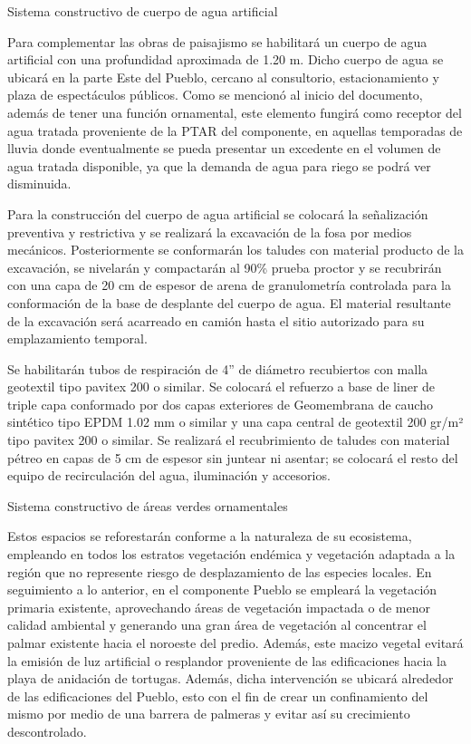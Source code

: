 \documentclass{article}
\begin{document}
\bigskip


\bigskip

Sistema constructivo de cuerpo de agua artificial


\bigskip

Para complementar las obras de paisajismo se habilitará un cuerpo de agua artificial con una profundidad aproximada de 1.20 m. Dicho cuerpo de agua se ubicará en la parte Este del Pueblo, cercano al consultorio, estacionamiento y plaza de espectáculos públicos. Como se mencionó al inicio del documento, además de tener una función ornamental, este elemento fungirá como receptor del agua tratada proveniente de la PTAR del componente, en aquellas temporadas de lluvia donde eventualmente se pueda presentar un excedente en el volumen de agua tratada disponible, ya que la demanda de agua para riego se podrá ver disminuida. 


\bigskip

Para la construcción del cuerpo de agua artificial se colocará la señalización preventiva y restrictiva y se realizará la excavación de la fosa por medios mecánicos. Posteriormente se conformarán los taludes con material producto de la excavación, se nivelarán y compactarán al 90\% prueba proctor y se recubrirán con una capa de 20 cm de espesor de arena de granulometría controlada para la conformación de la base de desplante del cuerpo de agua. El material resultante de la excavación será acarreado en camión hasta el sitio autorizado para su emplazamiento temporal.


\bigskip

Se habilitarán tubos de respiración de 4” de diámetro recubiertos con malla geotextil tipo pavitex 200 o similar. Se colocará el refuerzo a base de liner de triple capa conformado por dos capas exteriores de Geomembrana de caucho sintético tipo EPDM 1.02 mm o similar y una capa central de geotextil 200 gr/m² tipo pavitex 200 o similar. Se realizará el recubrimiento de taludes con material pétreo en capas de 5 cm de espesor sin juntear ni asentar; se colocará el resto del equipo de recirculación del agua, iluminación y accesorios.


\bigskip


\bigskip

Sistema constructivo de áreas verdes ornamentales


\bigskip

Estos espacios se reforestarán conforme a la naturaleza de su ecosistema, empleando en todos los estratos vegetación endémica y vegetación adaptada a la región que no represente riesgo de desplazamiento de las especies locales. En seguimiento a lo anterior, en el componente Pueblo se empleará la vegetación primaria existente, aprovechando áreas de vegetación impactada o de menor calidad ambiental y generando una gran área de vegetación al concentrar el palmar existente hacia el noroeste del predio. Además, este macizo vegetal evitará la emisión de luz artificial o resplandor proveniente de las edificaciones hacia la playa de anidación de tortugas. Además, dicha intervención se ubicará alrededor de las edificaciones del Pueblo, esto con el fin de crear un confinamiento del mismo por medio de una barrera de palmeras y evitar así su crecimiento descontrolado.
\end{document}

